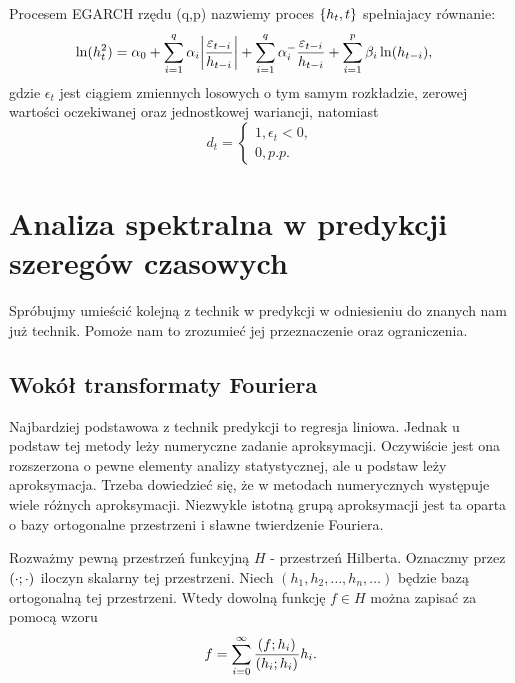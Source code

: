 \documentclass[10pt,a4paper]{book}
\begin{document}
\begin{definition}
Procesem EGARCH rzędu (q,p) nazwiemy proces $\left\lbrace {{h_t}, {t}} \right\rbrace$ spełniajacy równanie:
\begin{align*}
\ln(h_t^2) &= \alpha_0 + \sum_{i=1}^{q} \alpha_i \abs{\frac{\epsilon_{t-i}}{h_{t-i}}} + 
\sum_{i=1}^{q} \alpha^{-}_i \frac{\epsilon_{t-i}}{h_{t-i}} + 
\sum_{i=1}^{p} \beta_{i} \ln(h_{t-i}),
\end{align*}
gdzie $\epsilon_t$ jest ciągiem zmiennych losowych o tym samym rozkładzie, zerowej wartości oczekiwanej oraz jednostkowej wariancji, natomiast
$$
d_t = \begin{cases} 1, \epsilon_t < 0, \\ 0, p.p. \end{cases}
$$
\end{definition}

\chapter{Analiza spektralna w predykcji szeregów czasowych}

Spróbujmy umieścić kolejną z technik w predykcji w odniesieniu do znanych nam już technik. Pomoże nam to zrozumieć jej przeznaczenie oraz ograniczenia.

\section{Wokół transformaty Fouriera}

Najbardziej podstawowa z technik predykcji to regresja liniowa. Jednak u podstaw tej metody leży numeryczne zadanie aproksymacji. Oczywiście jest ona rozszerzona o pewne elementy analizy statystycznej, ale u podstaw leży aproksymacja. Trzeba dowiedzieć się, że w metodach numerycznych występuje wiele różnych aproksymacji. Niezwykle istotną grupą aproksymacji jest ta oparta o bazy ortogonalne przestrzeni i sławne twierdzenie Fouriera.

\begin{theorem}
Rozważmy pewną przestrzeń funkcyjną $H$ - przestrzeń Hilberta. Oznaczmy przez $\left( {\cdot} ; {\cdot} \right)_{}$ iloczyn skalarny tej przestrzeni. Niech $(h_1, h_2, \ldots, h_n, \ldots)$ będzie bazą ortogonalną tej przestrzeni. Wtedy dowolną funkcję $f \in H$ można zapisać za pomocą wzoru
$$
f = \sum_{i=0}^{\infty} \frac{\scalar{f}{h_i} }{\scalar{h_i}{h_i}} h_i.
$$
\end{theorem}
\end{document}
